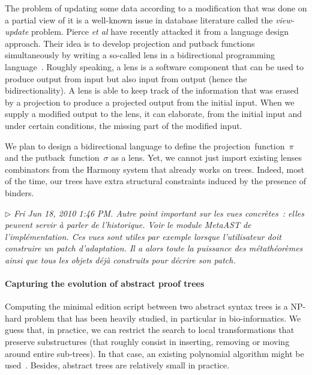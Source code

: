 \documentclass{article}
\newcommand{\remtext}[1]{\textcolor{bwgreen}{$\triangleright$ \textsl{#1}}}
\begin{document}
The problem of updating some data according to a modification that was
done on a partial view of it is a well-known issue in database
literature called the \textit{view-update} problem. Pierce \textit{et
  al} have recently attacked it from a language design approach. Their
idea is to develop projection and putback functions simultaneously by
writing a so-called lens in a bidirectional programming
language~\cite{pierce-bidirectional}. Roughly speaking, a lens is a
software component that can be used to produce output from input but
also input from output (hence the bidirectionality). A lens is able
to keep track of the information that was erased by a projection to
produce a projected output from the initial input. When we supply a
modified output to the lens, it can elaborate, from the initial input
and under certain conditions, the missing part of the modified input. 

We plan to design a bidirectional language to define the
projection~function~$\pi$ and the putback~function~$\sigma$ as a
lens. Yet, we cannot just import existing lenses combinators from the
Harmony system that already works on trees. Indeed, most of the time,
our trees have extra structural constraints induced by the presence of
binders. 

\remtext{Fri Jun 18, 2010 1:46 PM. Autre point important sur les vues
  concrètes~: elles peuvent servir à parler de l'historique.  Voir le
  module MetaAST de l'implémentation. Ces vues sont utiles par exemple
  lorsque l'utilisateur doit construire un patch d'adaptation. Il a
  alors toute la puissance des métathéorèmes ainsi que tous les objets
  déjà construits pour décrire son patch.}

\paragraph{Capturing the evolution of abstract proof trees}
\-

Computing the minimal edition script between two abstract syntax trees
is a NP-hard problem that has been heavily studied, in particular in
bio-informatics.  We guess that, in practice, we can restrict the
search to local transformations that preserve substructures (that
roughly consist in inserting, removing or moving around entire
sub-trees). In that case, an existing polynomial algorithm might be
used~\cite{REF!}. Besides, abstract trees are relatively small in
practice. 
\end{document}
